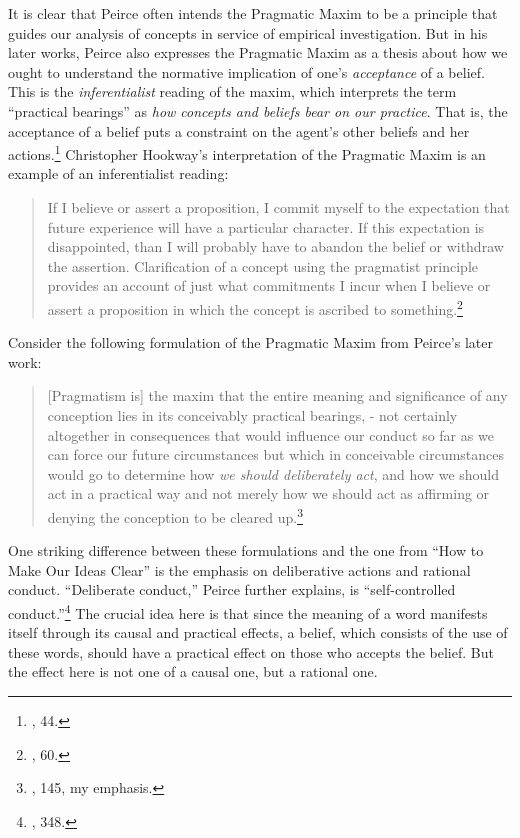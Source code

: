 It is clear that Peirce often intends the Pragmatic Maxim to be a
principle that guides our analysis of concepts in service of empirical
investigation. But in his later works, Peirce also expresses the
Pragmatic Maxim as a thesis about how we ought to understand the
normative implication of one's \emph{acceptance} of a belief. This is
the \emph{inferentialist} reading of the maxim, which interprets the
term ``practical bearings'' as \emph{how concepts and beliefs bear on
our practice}. That is, the acceptance of a belief puts a constraint on
the agent's other beliefs and her actions.\footnote{\cite{whatpragwas}, 44.} Christopher Hookway's interpretation of the
Pragmatic Maxim is an example of an inferentialist reading:

\begin{quote}
If I believe or assert a proposition, I commit myself to the expectation
that future experience will have a particular character. If this
expectation is disappointed, than I will probably have to abandon the
belief or withdraw the assertion. Clarification of a concept using the
pragmatist principle provides an account of just what commitments I
incur when I believe or assert a proposition in which the concept is
ascribed to something.\footnote{\cite{hookway1}, 60.}
\end{quote}

Consider the following formulation of the Pragmatic Maxim from Peirce's
later work:

\begin{quote}
{[}Pragmatism is{]} the maxim that the entire meaning and significance
of any conception lies in its conceivably practical bearings, - not
certainly altogether in consequences that would influence our conduct so
far as we can force our future circumstances but which in conceivable
circumstances would go to determine how \emph{we should deliberately
act}, and how we should act in a practical way and not merely how we
should act as affirming or denying the conception to be cleared
up.\footnote{\cite{essentialpeirce2}, 145, my emphasis.}
\end{quote}

One striking difference between these formulations and the one from
``How to Make Our Ideas Clear'' is the emphasis on deliberative actions and
rational conduct. ``Deliberate conduct,'' Peirce further explains, is
``self-controlled conduct.''\footnote{\cite{essentialpeirce2}, 348.} The crucial idea
here is that since the meaning of a word manifests itself through its
causal and practical effects, a belief, which consists of the use of
these words, should have a practical effect on those who accepts the
belief. But the effect here is not one of a causal one, but a rational
one.

